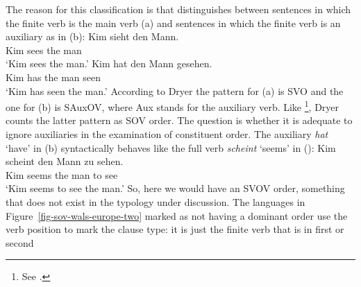 The reason for this classification is that \citet[Section~1]{Dryer2013c} distinguishes between sentences in which the finite
verb is the main verb (a) and sentences in which the finite verb is an auxiliary as in (b):
\eal
\ex 
\gll Kim sieht den Mann.\\
     Kim sees the man\\
\glt `Kim sees the man.'
\ex
\gll Kim hat den Mann gesehen.\\
     Kim has the man seen\\
\glt `Kim has seen the man.'
\zl
According to Dryer the pattern for (a) is SVO and the one for (b) is SAuxOV, where Aux
stands for the auxiliary verb. Like
\citet{Greenberg63a-u}\footnote{%
  See .
}, Dryer counts the latter pattern as SOV order. The question is whether it is adequate to ignore auxiliaries
in the examination of constituent order. The auxiliary \emph{hat} `have' in (b) syntactically
behaves like the full verb \emph{scheint} `seems' in ():
\ea
\gll Kim scheint den Mann zu sehen.\\
     Kim seems   the man  to see\\
\glt `Kim seems to see the man.'
\z
So, here we would have an SVOV order, something that does not exist in the typology under discussion.
The languages in Figure~\ref{fig-sov-wals-europe-two} marked as not having a dominant order use the
verb position to mark the clause type: it is just the finite verb that is in first or second
